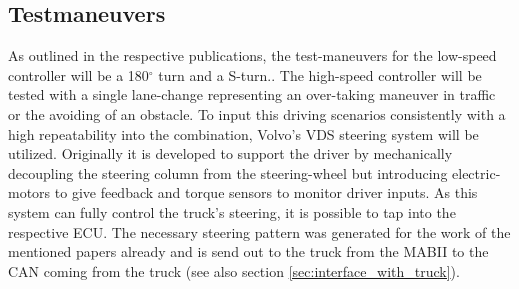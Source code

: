 \documentclass[ExampleMasters.tex]{subfiles}
\begin{document}
\subsection{Testmaneuvers}

As outlined in the respective publications, the test-maneuvers for the low-speed controller will be a 180$^{\circ}$ turn and a S-turn.\cite{Low-speed_paper}. The high-speed controller will be tested with a single lane-change representing an over-taking maneuver in traffic or the avoiding of an obstacle.\cite{High-speed_paper} To input this driving scenarios consistently with a high repeatability into the combination, Volvo's \gls{VDS} steering system will be utilized. Originally it is developed to support the driver by mechanically decoupling the steering column from the steering-wheel but introducing electric-motors to give feedback and torque sensors to monitor driver inputs. As this system can fully control the truck's steering, it is possible to tap into the respective \gls{ECU}. The necessary steering pattern was generated for the work of the mentioned papers already and is send out to the truck from the \gls{MABII} to the \gls{CAN} coming from the truck (see also section \ref{sec:interface_with_truck}).
\end{document}
